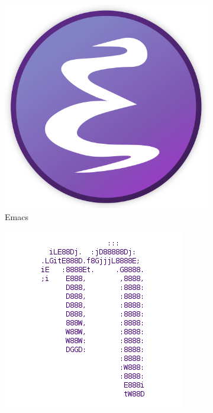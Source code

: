 \documentclass[a4paper]{article}
\begin{document}
\begin{figure}[h!]
	\centering
	\begin{subfigure}{0.3\linewidth}
		\includegraphics[scale=0.1,width = \linewidth]{emacslogo.png}
		\caption{Emacs}
	\end{subfigure}
	\begin{subfigure}{0.3\linewidth}
		\includegraphics[scale=0.4,width = \linewidth]{nanologo.png}

\end{subfigure}
\end{figure}
\end{document}

